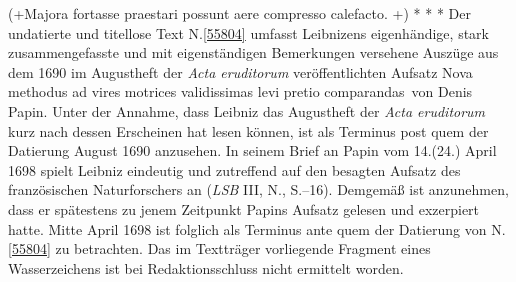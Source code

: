 \pend%
\pstart%
(+\;Majora fortasse praestari possunt
aere compresso calefacto.%
%
%
\;\lbrack+)\rbrack%
\pend%
\vspace{4.0em}%
\pstart%
\noindent%
\centering%
*     *     *
\pend%
\vspace{3.0em}%
%
\frenchspacing%
\footnotesize%
\pstart%
\noindent%
%
Der undatierte und titellose Text N.\;\ref{55804} umfasst Leibnizens eigenhändige, stark zusammengefasste und mit eigenständigen Bemerkungen versehene Auszüge aus dem 1690 im Augustheft der \textit{Acta eruditorum}\cite{01023} veröffentlichten Aufsatz \glqq Nova methodus ad vires motrices validissimas levi pretio comparandas\grqq\ von Denis Papin.\cite{01479}
Unter der Annahme, dass Leibniz das Augustheft der \textit{Acta eruditorum}\cite{01023} kurz nach dessen Erscheinen hat lesen können, ist als Terminus post quem der Datierung August 1690 anzusehen.
\pend%
\pstart%
In seinem Brief an Papin vom 14.\;(24.) April 1698 spielt Leibniz eindeutig und zutreffend auf den besagten Aufsatz des französischen Naturforschers an (\textit{LSB} III, N., S.--16).\cite{01480}
Demgemäß ist anzunehmen, dass er spätestens zu jenem Zeitpunkt Papins Aufsatz gelesen und exzerpiert hatte.
Mitte April 1698 ist folglich als Terminus ante quem der Datierung von N.\;\ref{55804} zu betrachten.
Das im Textträger vorliegende Fragment eines Wasserzeichens ist bei Redaktionsschluss nicht ermittelt worden.
\pend%
%
\frenchspacing%
\normalsize%
\newpage%
